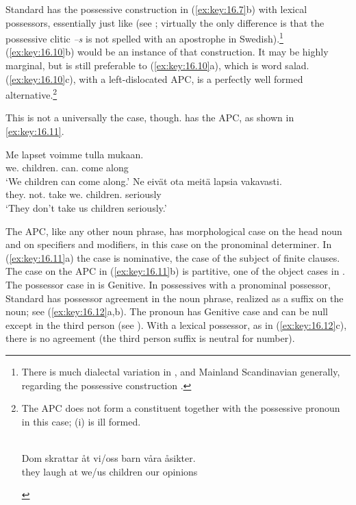 \documentclass[output=paper]{langsci/langscibook}
\begin{document}
Standard  has the possessive construction in (\ref{ex:key:16.7}b) with
lexical possessors, essentially just like  (see
\citealt{Delsing1998,Julien2005}; virtually the only difference is that the possessive clitic
\emph{–s} is not spelled with an apostrophe in Swedish).\footnote{There is much
dialectal variation in , and Mainland Scandinavian generally, regarding
the possessive construction
\parencite{HolmbergSandstrom1996,Delsing1998,Julien2005}.}
(\ref{ex:key:16.10}b) would be an instance of that construction. It may be
highly marginal, but is still preferable to (\ref{ex:key:16.10}a), which is
word salad. (\ref{ex:key:16.10}c), with a left-dislocated
\gls{APC}, is a perfectly well formed
alternative.\footnote{The \gls{APC} does
    not form a constituent together with the possessive pronoun in this case;
    (i) is ill formed.

\begin{exe}
    \\
	\gll \llap{*}Dom skrattar åt vi/oss barn våra åsikter.\\
         they laugh at we/us children our opinions\\
\end{exe}}

This is not a universally the case, though.  has the \gls{APC}, as shown in
\eqref{ex:key:16.11}.

\ea
    \label{ex:key:16.11}
	\ea
		\gll Me lapset                      voimme  tulla mukaan. \\
			we.\Nom{} children.\Nom{} can.\Fpl{} come along\\
		\glt    `We children can come along.'
	\ex
		\gll Ne  eivät      ota  meitä    lapsia         vakavasti.\\
			they.\Nom{} not.\Tpl{}  take we.\Part{} children.\Part{} seriously\\
		\glt    `They don’t take us children seriously.'
	\z
\z

The  \gls{APC}, like any other noun
phrase, has morphological case on the head noun and on specifiers and
modifiers, in this case on the pronominal determiner. In (\ref{ex:key:16.11}a)
the case is nominative, the case of the subject of finite
clauses. The case on the \gls{APC} in
(\ref{ex:key:16.11}b) is partitive, one of the object cases in . The
possessor case in  is Genitive.  In possessives with a pronominal
possessor, Standard  has possessor agreement in the noun phrase,
realized as a suffix on the noun; see (\ref{ex:key:16.12}a,b).  The pronoun has
Genitive case and can be null except in the third person (see
\citealt{BratticoHuhmarniemi2015}). With a lexical possessor, as in
(\ref{ex:key:16.12}c), there is no agreement (the third person suffix is
neutral for number).
\end{document}
